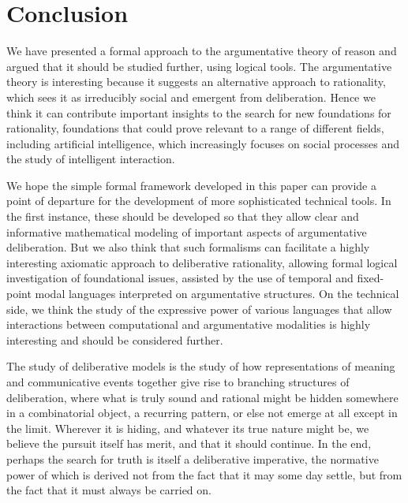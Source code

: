 \documentclass[greybox]{svmult}
\begin{document}
\section{Conclusion}\label{sec:conc}

We have presented a formal approach to the argumentative theory of reason and argued that it should be studied further, using logical tools. The argumentative theory is interesting because it suggests an alternative approach to rationality, which sees it as irreducibly social and emergent from deliberation. Hence we think it can contribute important insights to the search for new foundations for rationality, foundations that could prove relevant to a range of different fields, including artificial intelligence, which increasingly focuses on social processes and the study of intelligent interaction.

We hope the simple formal framework developed in this paper can provide a point of departure for the development of more sophisticated technical tools. In the first instance, these should be developed so that they allow clear and informative mathematical modeling of important aspects of argumentative deliberation. But we also think that such formalisms can facilitate a highly interesting axiomatic approach to deliberative rationality,  allowing formal logical investigation of foundational issues, assisted by the use of temporal and fixed-point modal languages interpreted on argumentative structures. On the technical side, we think the study of the expressive power of various languages that allow interactions between computational and argumentative modalities is highly interesting and should be considered further. 

The study of deliberative models is the study of how representations of meaning and communicative events together give rise to branching structures of deliberation, where what is truly sound and rational might be hidden somewhere in a combinatorial object, a recurring pattern, or else not emerge at all except in the limit. Wherever it is hiding, and whatever its true nature might be, we believe the pursuit itself has merit, and that it should continue. In the end, perhaps the search for truth is itself a deliberative imperative, the normative power of which is derived not from the fact that it may some day settle, but from the fact that it must always be carried on.



\end{document}
